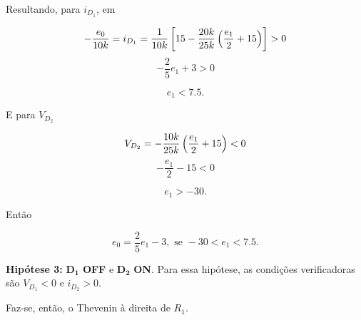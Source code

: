 \documentclass{article}
\numberwithin{equation}{section}
\newlength\Colsep
\let\l\left
\let\r\right
\let\dfr\dfrac
\newcommand{\itembull}[1]{\noindent\textbf{\small{\textbullet \hspace{1.5mm}#1}}}
\begin{document}
\noindent Resultando, para $i_{D_1}$, em

\begin{equation*}
    -\dfr{e_0}{10k} = i_{D_1} = \dfr{1}{10k}\l[15-\dfr{20k}{25k}\l(\dfr{e_1}{2}+15\r)\r]>0\\
\end{equation*}
\begin{equation*}
    -\dfr{2}{5}e_1+3>0
\end{equation*}

\begin{equation}
    e_1<7.5.
\end{equation}

\noindent E para $V_{D_2}$

\begin{equation*}
    V_{D_2} = -\dfr{10k}{25k}\l(\dfr{e_1}{2}+15\r)<0\\
\end{equation*}
\begin{equation*}
    -\dfr{e_1}{2}-15<0
\end{equation*}

\begin{equation}
    e_1>-30.
\end{equation}

\noindent Então

\begin{equation}
\label{eq:h2}
    e_0 = \dfr{2}{5}e_1-3, \text{ se }  -30<e_1<7.5.
\end{equation}

\itembull{Hipótese 3:} $\mathbf{D_1}$ \textbf{OFF} e $\mathbf{D_2}$ \textbf{ON}. Para essa hipótese, as condições verificadoras são $V_{D_1}<0$ e $i_{D_2}>0$.


\noindent\begin{minipage}{0.95\textwidth}
\begin{minipage}[c][7cm][c]{\dimexpr0.6\textwidth-0.5\Colsep\relax}
    \begin{center}
    \end{center}
\end{minipage} \hfill
\begin{minipage}[c][7cm][c]{\dimexpr0.4\textwidth-0.5\Colsep\relax}
    Faz-se, então, o Thevenin à direita de $R_1$.
\end{minipage}
\end{minipage}
\end{document}
